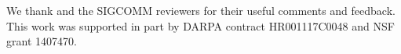 \label{s:acknowledgements}
 We thank
and the SIGCOMM reviewers for their useful comments and feedback.
This work was supported in part by DARPA contract HR001117C0048 and NSF grant 1407470.
